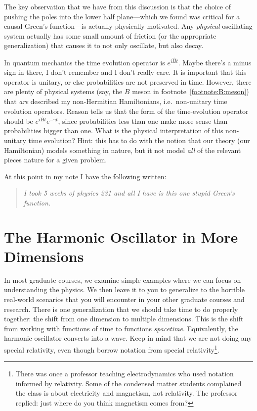  The key observation that we have from this discussion is that the choice of pushing the poles into the lower half plane---which we found was critical for a causal Green's function---is actually physically motivated. Any \emph{physical} oscillating system actually has some small amount of friction (or the appropriate generalization) that causes it to not only oscillate, but also decay. 
 \begin{exercise}
 In quantum mechanics the time evolution operator is $e^{i\hat H t}$. Maybe there's a minus sign in there, I don't remember and I don't really care. It is important that this operator is unitary, or else probabilities are not preserved in time. However, there are plenty of physical systems (say, the $B$ meson in footnote~\ref{footnote:B:meson}) that \emph{are} described my non-Hermitian Hamiltonians, i.e.~non-unitary time evolution operators. Reason tells us that the form of the time-evolution operator should be $e^{i\hat H t}e^{-\gamma t}$, since probabilities less than one make more sense than probabilities bigger than one. What is the physical interpretation of this non-unitary time evolution? Hint: this has to do with the notion that our theory (our Hamiltonian) models something in nature, but it not model \emph{all} of the relevant pieces nature for a given problem.
 \end{exercise}
 At this point in my note I have the following written:
 \begin{quote}
 \emph{I took 5 weeks of physics 231 and all I have is this one stupid Green's function.}
 \end{quote}
 
 
 
\chapter{The Harmonic Oscillator in More Dimensions}



In most graduate courses, we examine simple examples where we can focus on understanding the physics. We then leave it to you to generalize to the horrible real-world scenarios that you will encounter in your other graduate courses and research. There is one generalization that we should take time to do properly together: the shift from one dimension to multiple dimensions. This is the shift from working with functions of time to functions \emph{spacetime}. Equivalently, the harmonic oscillator converts into a wave.
%
Keep in mind that we are not doing any special relativity, even though borrow notation from special relativity\footnote{There was once a professor teaching electrodynamics who used notation informed by relativity. Some of the condensed matter students complained the class is about electricity and magnetism, not relativity. The professor replied: just where do you think magnetism comes from?}. 




